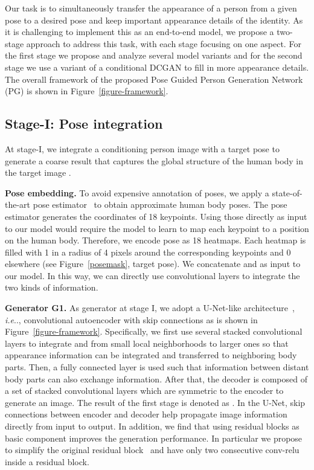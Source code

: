 \documentclass{article}
\makeatletter
\newcommand{\myparagraph}[1]{\vspace{0.0em}\noindent\textbf{#1}}
\DeclareRobustCommand\onedot{\futurelet\@let@token\@onedot}
\def\@onedot{\ifx\@let@token.\else.\null\fi\xspace}
\def\ie{\emph{i.e}\onedot}
\makeatother
\begin{document}
Our task is to simultaneously transfer the appearance of a person from a given pose to a desired pose and keep important appearance details of the identity. As it is challenging to implement this as an end-to-end model, we propose a two-stage approach to address this task, with each stage focusing on one aspect. For the first stage we propose and analyze several model variants and for the second stage we use a variant of a conditional  
DCGAN to fill in more appearance details. The overall framework of the proposed Pose Guided Person Generation Network (PG) is shown in Figure~\ref{figure-framework}.

\subsection{Stage-I: Pose integration}
\label{sec:PoseIntegration}
At stage-I, we integrate a conditioning person image  with a target pose  to generate a coarse result  that captures the global structure of the human body in the target image .


\myparagraph{Pose embedding.} To avoid expensive annotation of poses, we apply a state-of-the-art pose estimator~\cite{poseEstimation} to obtain approximate human body poses. The pose estimator generates the coordinates of 18 keypoints.
Using those directly as input to our model would require the model
to learn to map each keypoint to a position on the human body. Therefore, we encode pose  as 18 heatmaps.
Each heatmap is filled with 1 in a radius of 4 pixels around the corresponding keypoints and 0 elsewhere  
(see Figure~\ref{posemask}, target pose). 
We concatenate  and  as input to our model. In this way, we can directly use convolutional layers to integrate the two kinds of information. 

\myparagraph{Generator G1.}
As generator at stage I, we adopt a U-Net-like architecture~\cite{Res-Unet-autoencoder-seg}, \ie, convolutional autoencoder with skip connections as is shown in Figure~\ref{figure-framework}. Specifically, we first use several stacked convolutional layers to integrate  and  from small local neighborhoods to larger ones
so that appearance information can be integrated and transferred to neighboring body parts.
Then, a fully connected layer is used such that information between distant body parts can also exchange information.
After that, the decoder is composed of a set of stacked convolutional layers which are symmetric to the encoder to generate an image. The result of the first stage is denoted as .
In the U-Net, skip connections between encoder and decoder help propagate image information directly from input to output. In addition, we find that using residual blocks as basic component improves the generation performance. In particular we propose to simplify the original residual block~\cite{ResidualNet} and have only two consecutive conv-relu inside a residual block. 
\end{document}
